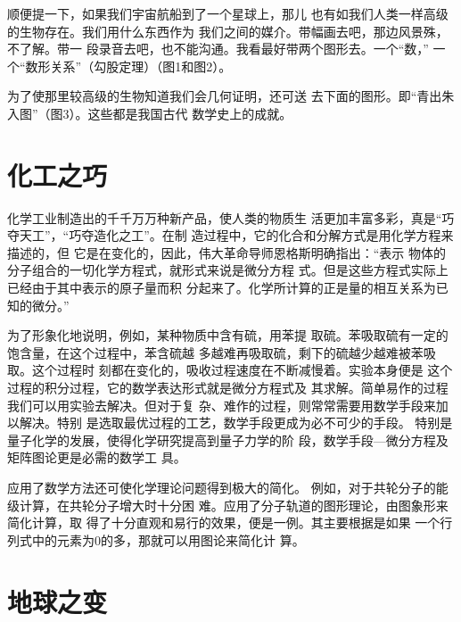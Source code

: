 \documentclass[twoside,openright,headings=optiontohead]{ctexbook} %
\begin{document}
{顺便提一下，如果我们宇宙航船到了一个星球上，那儿
也有如我们人类一样高级的生物存在。我们用什么东西作为
我们之间的媒介。带幅画去吧，那边风景殊，不了解。带一
段录音去吧，也不能沟通。我看最好带两个图形去。一个``数，''
一个``数形关系''（勾股定理）（图1和图2）。

为了使那里较高级的生物知道我们会几何证明，还可送
去下面的图形。即``青出朱入图''（图3）。这些都是我国古代 数学史上的成就。

\section{化工之巧}\label{ux5316ux5de5ux4e4bux5de7}

化学工业制造出的千千万万种新产品，使人类的物质生
活更加丰富多彩，真是``巧夺天工''，``巧夺造化之工''。在制
造过程中，它的化合和分解方式是用化学方程来描述的，但
它是在变化的，因此，伟大革命导师恩格斯明确指出：``表示
物体的分子组合的一切化学方程式，就形式来说是微分方程
式。但是这些方程式实际上已经由于其中表示的原子量而积
分起来了。化学所计算的正是量的相互关系为已知的微分。''

为了形象化地说明，例如，某种物质中含有硫，用苯提
取硫。苯吸取硫有一定的饱含量，在这个过程中，苯含硫越
多越难再吸取硫，剩下的硫越少越难被苯吸取。这个过程时
刻都在变化的，吸收过程速度在不断减慢着。实验本身便是
这个过程的积分过程，它的数学表达形式就是微分方程式及
其求解。简单易作的过程我们可以用实验去解决。但对于复
杂、难作的过程，则常常需要用数学手段来加以解决。特别
是选取最优过程的工艺，数学手段更成为必不可少的手段。
特别是量子化学的发展，使得化学研究提高到量子力学的阶
段，数学手段---微分方程及矩阵图论更是必需的数学工 具。

应用了数学方法还可使化学理论问题得到极大的简化。
例如，对于共轮分子的能级计算，在共轮分子增大时十分困
难。应用了分子轨道的图形理论，由图象形来简化计算，取
得了十分直观和易行的效果，便是一例。其主要根据是如果
一个行列式中的元素为0的多，那就可以用图论来简化计 算。

\section{地球之变}\label{ux5730ux7403ux4e4bux53d8}

我们所生活的地球处于多变的状态之中，从高层的大
气，到中层的海洋，下到地壳，深入地心都在剧烈地运动着，
而这些运动规律的研究也都用到数学。

大气环流，风云雨雪，天天需要研究和预报，使得农民
可以安排田间农活，空中交通运输可以安排航程。限风等灾
害性天气的预报，使得海军，渔民和沿海地区能够及早预防，
减少损害。而所有这些预报都离不了数学。

}
\end{document}
